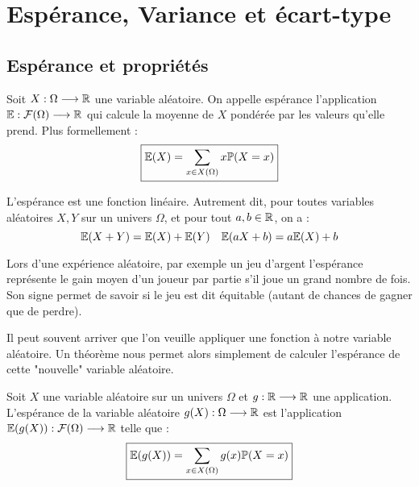 
\section{Espérance, Variance et écart-type}

\subsection{Espérance et propriétés}

\begin{definition}[Espérance]
    Soit $X : \Omega \longrightarrow \mathbb{R}$ une variable aléatoire. 
    On appelle espérance l'application $ \mathbb{E} : \mathcal{F}(\Omega) \longrightarrow \mathbb{R} $ qui calcule la moyenne de $X$ pondérée par les valeurs qu'elle prend. 
    Plus formellement :
        \[ \boxed { \mathbb{E}(X) = \sum_{x \in X(\Omega)} x \mathbb{P}(X = x) }\] 
\end{definition}

\begin{prop}[Espérance]
    L'espérance est une fonction linéaire. Autrement dit, pour toutes variables aléatoires $X,Y$ sur  un univers $\Omega$, 
    et pour tout $a,b \in \mathbb{R}$, on a :
        \[ \mathbb{E}(X+Y) = \mathbb{E}(X) + \mathbb{E}(Y) \quad \mathbb{E}(aX + b) = a\mathbb{E}(X) + b \]
\end{prop}

Lors d'une expérience aléatoire, par exemple un jeu d'argent l'espérance représente le gain moyen d'un joueur par partie 
s'il joue un grand nombre de fois. Son signe permet de savoir si le jeu est dit équitable (autant de chances de gagner que 
de perdre). 

\vspace{0.3cm}

Il peut souvent arriver que l'on veuille appliquer une fonction à notre variable aléatoire. 
Un théorème nous permet alors simplement de calculer l'espérance de cette "nouvelle" variable aléatoire. 

\begin{theorem}[Transfert]
    Soit $X$ une variable aléatoire sur un univers $\Omega$ et $g : \mathbb{R} \longrightarrow \mathbb{R}$ une application. 
    L'espérance de la variable aléatoire $g(X) : \Omega \longrightarrow \mathbb{R}$ est l'application $ \mathbb{E}(g(X)) : \mathcal{F}(\Omega) \longrightarrow \mathbb{R}$ 
    telle que : 
        \[ \boxed{ \mathbb{E}(g(X)) = \sum_{x \in X(\Omega)} g(x) \mathbb{P}(X = x) } \]  
\end{theorem}

